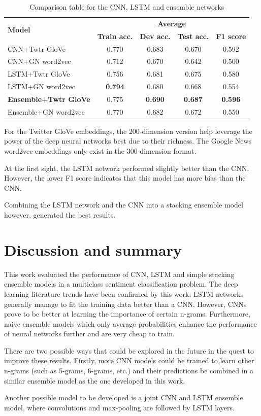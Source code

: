 \documentclass[10pt,conference,compsocconf]{IEEEtran}
\begin{document}
\begin{table} \centering
\begin{tabular}[c]{ l c c c c}
	\toprule
	\multirow{2}{*}{\textbf{Model}} & \multicolumn{4}{c}{\textbf{Average}} \\
	 & \textbf{Train acc.} & \textbf{Dev acc.} & \textbf{Test acc.} &  \textbf{F1 score} \\
	\midrule
    CNN+Twtr GloVe & 0.770 & 0.683 & 0.670 & 0.592 \\
    CNN+GN word2vec & 0.712 & 0.670 & 0.642 & 0.500 \\
    \midrule
    LSTM+Twtr GloVe & 0.756 & 0.681 & 0.675 & 0.580 \\
    LSTM+GN word2vec & \textbf{0.794} & 0.680 & 0.668 & 0.554 \\
    \midrule
    \textbf{Ensemble+Twtr GloVe} & 0.775 & \textbf{0.690} & \textbf{0.687} & \textbf{0.596} \\
    Ensemble+GN word2vec & 0.770 & 0.682 & 0.672 & 0.550 \\
    \bottomrule
\end{tabular}
\caption{Comparison table for the CNN,  LSTM and ensemble networks}
\label{table:nn_results}
\end{table}

For the Twitter GloVe embeddings, the 200-dimension version help leverage the power of the deep neural networks best due to their richness. The Google News word2vec embeddings only exist in the 300-dimension format.

At the first sight, the LSTM network performed slightly better than the CNN. However, the lower F1 score indicates that this model has more bias than the CNN.

Combining the LSTM network and the CNN into a stacking ensemble model however, generated the best results.

\section{Discussion and summary} 
\label{sec:summary}

This work evaluated the performance of CNN, LSTM and simple stacking ensemble models in a multiclass sentiment classification problem. The deep learning literature trends have been confirmed by this work. LSTM networks generally manage to fit the training data better than a CNN. However, CNNs prove to be better at learning the importance of certain n-grams. Furthermore, naive ensemble models which only average probabilities enhance the performance of neural networks further and are very cheap to train. 

There are two possible ways that could be explored in the future in the quest to improve these results. Firstly, more CNN models could be trained to learn other n-grams (such as 5-grams, 6-grams, etc.) and their predictions be combined in a similar ensemble model as the one developed in this work. 

Another possible model to be developed is a joint CNN and LSTM ensemble model, where convolutions and max-pooling are followed by LSTM layers.



\end{document}
